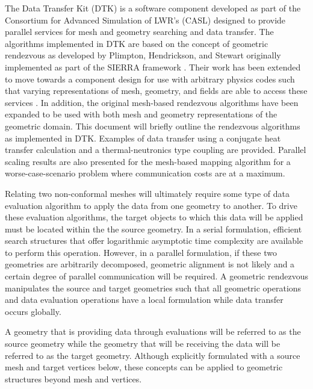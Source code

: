\documentclass{mc2013}
\begin{document}
The Data Transfer Kit (DTK) is a software component developed as part
of the Consortium for Advanced Simulation of LWR's (CASL)
\cite{u.s._department_of_energy_casl_2011} designed to provide
parallel services for mesh and geometry searching and data
transfer. The algorithms implemented in DTK are based on the concept
of geometric rendezvous as developed by Plimpton, Hendrickson, and
Stewart \cite{Plimpton_2004} originally implemented as part of the
SIERRA framework \cite{Stewart_2004}. Their work has been extended to
move towards a component design for use with arbitrary physics codes
such that varying representations of mesh, geometry, and fields are
able to access these services \cite{Chand_2008}. In addition, the
original mesh-based rendezvous algorithms have been expanded
to be used with both mesh and geometry representations of the
geometric domain. This document will briefly outline the rendezvous
algorithms as implemented in DTK. Examples of data transfer using a
conjugate heat transfer calculation and a thermal-neutronics type
coupling are provided. Parallel scaling results are also presented for
the mesh-based mapping algorithm for a worse-case-scenario problem
where communication costs are at a maximum.


\label{sec:geometric_rendezvous}

Relating two non-conformal meshes will ultimately require some type of
data evaluation algorithm to apply the data from one geometry to
another. To drive these evaluation algorithms, the target objects to
which this data will be applied must be located within the the source
geometry. In a serial formulation, efficient search structures that
offer logarithmic asymptotic time complexity are available to perform
this operation. However, in a parallel formulation, if these two
geometries are arbitrarily decomposed, geometric alignment is not
likely and a certain degree of parallel communication will be
required. A geometric rendezvous manipulates the source and target
geometries such that all geometric operations and data evaluation
operations have a local formulation while data transfer occurs
globally.

A geometry that is providing data through evaluations will be referred
to as the source geometry while the geometry that will be receiving
the data will be referred to as the target geometry. Although
explicitly formulated with a source mesh and target vertices below,
these concepts can be applied to geometric structures beyond mesh and
vertices.
\end{document}
